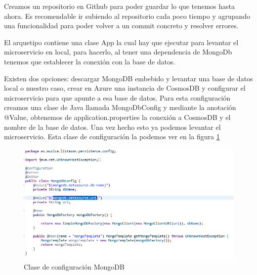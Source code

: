 \documentclass[12pt]{report} %
\begin{document}
Creamos un repositorio en Github \cite{repositorio} para poder guardar lo que tenemos hasta ahora. Es recomendable ir subiendo al repositorio cada poco tiempo y agrupando una funcionalidad para poder volver a un commit concreto y resolver errores.

El arquetipo contiene una clase App la cual hay que ejecutar para levantar el microservicio en local, para hacerlo, al tener una dependencia de MongoDb tenemos que establecer la conexión con la base de datos.

Existen dos opciones: descargar MongoDB embebido y levantar una base de datos local o nuestro caso, crear en Azure una instancia de CosmosDB y configurar el microservicio para que apunte a esa base de datos. Para esta configuración creamos una clase de Java llamada MongoDbConfig y mediante la anotación @Value, obtenemos de application.properties la conexión a CosmosDB y el nombre de la base de datos. Una vez hecho esto ya podemos levantar el microservicio. Esta clase de configuración la podemos ver en la figura \ref{fig:configmongo}

\begin{figure}
	\centering
	\includegraphics[width=0.7\linewidth]{imagenes/configMongo}
	\caption{Clase de configuración MongoDB}
	\label{fig:configmongo}
\end{figure}
\end{document}
